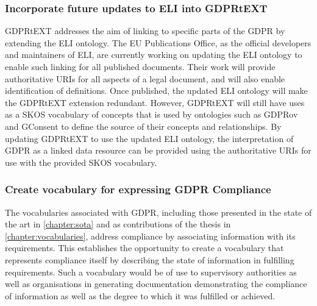 \subsubsection*{Incorporate future updates to ELI into GDPRtEXT}
GDPRtEXT addresses the aim of linking to specific parts of the GDPR by extending the ELI ontology. The EU Publications Office, as the official developers and maintainers of ELI, are currently working on updating the ELI ontology to enable such linking for all published documents. Their work will provide authoritative URIs for all aspects of a legal document, and will also enable identification of definitions. Once published, the updated ELI ontology will make the GDPRtEXT extension redundant. However, GDPRtEXT will still have uses as a SKOS vocabulary of concepts that is used by ontologies such as GDPRov and GConsent to define the source of their concepts and relationships. By updating GDPRtEXT to use the updated ELI ontology, the interpretation of GDPR as a linked data resource can be provided using the authoritative URIs for use with the provided SKOS vocabulary.

\subsubsection*{Create vocabulary for expressing GDPR Compliance}
The vocabularies associated with GDPR, including those presented in the state of the art in \autoref{chapter:sota} and as contributions of the thesis in \autoref{chapter:vocabularies}, address compliance by associating information with its requirements. This establishes the opportunity to create a vocabulary that represents compliance itself by describing the state of information in fulfilling requirements. Such a vocabulary would be of use to supervisory authorities as well as organisations in generating documentation demonstrating the compliance of information as well as the degree to which it was fulfilled or achieved.


